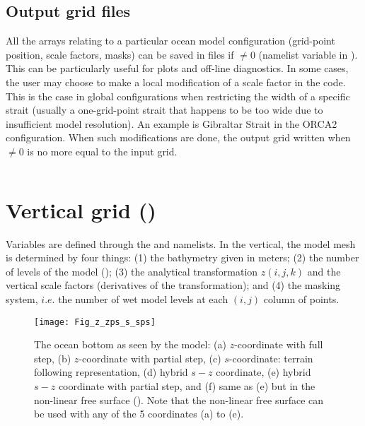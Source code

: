 \documentclass[../tex_main/NEMO_manual]{subfiles}
\begin{document}
\subsection{Output grid files}
\label{subsec:DOM_hgr_files}

All the arrays relating to a particular ocean model configuration (grid-point position, scale factors, masks)
can be saved in files if  $\not= 0$ (namelist variable in ).
This can be particularly useful for plots and off-line diagnostics.
In some cases, the user may choose to make a local modification of a scale factor in the code.
This is the case in global configurations when restricting the width of a specific strait
(usually a one-grid-point strait that happens to be too wide due to insufficient model resolution).
An example is Gibraltar Strait in the ORCA2 configuration.
When such modifications are done,
the output grid written when  $\not= 0$ is no more equal to the input grid.

$\ $\newline    %

\section{Vertical grid (\protect{})}
\label{sec:DOM_zgr}
%


Variables are defined through the  and  namelists.
In the vertical, the model mesh is determined by four things: 
(1) the bathymetry given in meters; 
(2) the number of levels of the model (); 
(3) the analytical transformation $z(i,j,k)$ and the vertical scale factors (derivatives of the transformation); and
(4) the masking system, $i.e.$ the number of wet model levels at each 
$(i,j)$ column of points.

\begin{figure}[!tb]    \begin{center}
\texttt{[image: Fig\_z\_zps\_s\_sps]}
\caption{  \protect\label{fig:z_zps_s_sps}
  The ocean bottom as seen by the model:
  (a) $z$-coordinate with full step,
  (b) $z$-coordinate with partial step,
  (c) $s$-coordinate: terrain following representation,
  (d) hybrid $s-z$ coordinate,
  (e) hybrid $s-z$ coordinate with partial step, and
  (f) same as (e) but in the non-linear free surface (\protect{}).
  Note that the non-linear free surface can be used with any of the 5 coordinates (a) to (e).}
\end{center}   \end{figure}
\end{document}

